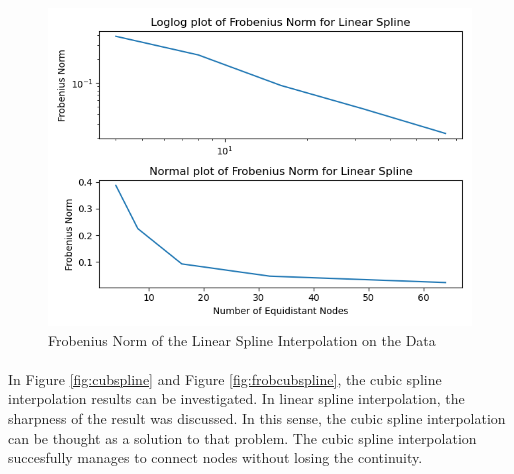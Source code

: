 \documentclass[letterpaper,12pt]{article}
\begin{document}
\begin{figure}[H]
    \centerline{\includegraphics[width=0.7\linewidth]{figures/froblinspline.png}}
    \caption{Frobenius Norm of the Linear Spline Interpolation on the Data}
    \label{fig:froblinspline}
    \end{figure}

\paragraph{} In Figure \ref{fig:cubspline} and Figure \ref{fig:frobcubspline}, the cubic spline interpolation results can be investigated. In linear spline interpolation, the sharpness of the result was discussed. In this sense, the cubic spline interpolation can be thought as a solution to that problem. The cubic spline interpolation succesfully manages to connect nodes without losing the continuity.
\end{document}
